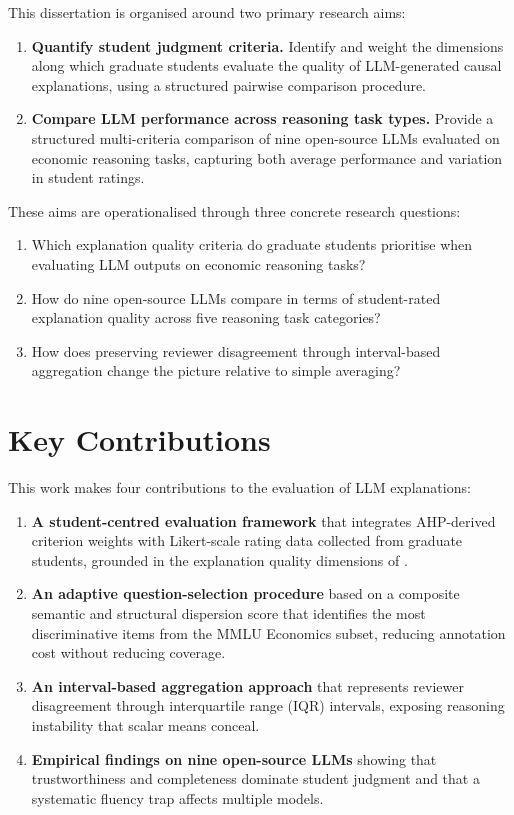 This dissertation is organised around two primary research aims:

\begin{enumerate}[label=\textbf{Aim \arabic*.}, leftmargin=*, labelindent=0pt]
  \item \textbf{Quantify student judgment criteria.} Identify and weight the
    dimensions along which graduate students evaluate the quality of LLM-generated
    causal explanations, using a structured pairwise comparison procedure.
  \item \textbf{Compare LLM performance across reasoning task types.} Provide a
    structured multi-criteria comparison of nine open-source LLMs evaluated on
    economic reasoning tasks, capturing both average performance and variation in
    student ratings.
\end{enumerate}

These aims are operationalised through three concrete research questions:

\begin{enumerate}
  \item Which explanation quality criteria do graduate students prioritise when
    evaluating LLM outputs on economic reasoning tasks?
  \item How do nine open-source LLMs compare in terms of student-rated explanation
    quality across five reasoning task categories?
  \item How does preserving reviewer disagreement through interval-based aggregation
    change the picture relative to simple averaging?
\end{enumerate}

\section{Key Contributions}
\label{sec:intro-contributions}

This work makes four contributions to the evaluation of LLM explanations:

\begin{enumerate}
  \item \textbf{A student-centred evaluation framework} that integrates AHP-derived
    criterion weights with Likert-scale rating data collected from graduate students,
    grounded in the explanation quality dimensions of \citet{hoffman2019metrics}.
  \item \textbf{An adaptive question-selection procedure} based on a composite
    semantic and structural dispersion score that identifies the most discriminative
    items from the MMLU Economics subset, reducing annotation cost without reducing
    coverage.
  \item \textbf{An interval-based aggregation approach} that represents reviewer
    disagreement through interquartile range (IQR) intervals, exposing reasoning
    instability that scalar means conceal.
  \item \textbf{Empirical findings on nine open-source LLMs} showing that
    trustworthiness and completeness dominate student judgment and that a systematic
    fluency trap affects multiple models.
\end{enumerate}

